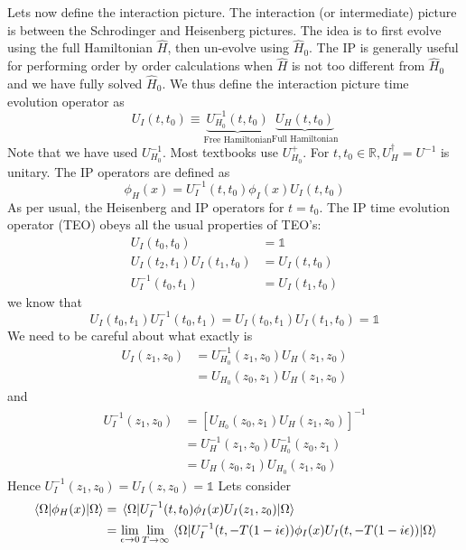 Lets now define the interaction picture. The interaction (or intermediate) picture is between the Schrodinger and Heisenberg pictures. The idea is to  first evolve using the full Hamiltonian $\hat{H}$, then un-evolve using $\hat{H}_0$. The IP is generally useful for performing order by order calculations when $\hat{H}$ is not too different from $\hat{H}_0$ and we have fully solved $\hat{H}_0$.  We thus define the interaction picture time evolution operator as
\begin{equation}
    U_I (t, t_0) \equiv \underbrace{U_{H_0}^{-1} (t, t_0)}_\text{Free Hamiltonian} \underbrace{U_H (t, t_0)}_\text{Full Hamiltonian}
\end{equation}
Note that we have used $U_{H_0}^{-1}$. Most textbooks use $U_{H_0}^{+}$. For $t, t_0 \in \mathbb{R}, U_{H}^{\dagger} = U^{-1}$ is unitary. The IP operators are defined as
\begin{equation}
    \phi_{H}(x)= U_{I}^{-1} (t, t_0) \phi_I (x) U_{I}(t, t_0)
\end{equation}
As per usual, the Heisenberg and IP operators for $t = t_0$. The IP time evolution operator (TEO) obeys all the usual properties of TEO's:
\begin{align}
    U_{I} (t_0, t_0) & = \mathds{1} \nonumber\\
    U_I (t_2, t_1) U_I (t_1, t_0) & = U_I (t, t_0)\nonumber\\
    U_{I}^{-1} (t_0, t_1) & = U_I (t_1, t_0)
\end{align}
we know that
\begin{equation}
    U_{I}(t_0 , t_1) U_{I}^{-1} (t_0, t_1)  = U_{I}(t_0, t_1) U_I (t_1, t_0) = \mathds{1}
\end{equation}
We need to be careful about what exactly is
\begin{align}
    U_I (z_1, z_0) & = U_{H_0}^{-1} (z_1 , z_0) U_{H} (z_1, z_0) \nonumber\\
    & = U_{H_0} (z_0 , z_1) U_{H} (z_1, z_0)
\end{align}
and 
\begin{align}
    U_{I}^{-1} (z_1, z_0) & = [U_{H_0} (z_0 , z_1) U_{H} (z_1, z_0)]^{-1} \nonumber\\
    & = U_{H}^{-1} (z_1 , z_0) U_{H_0}^{-1} (z_0, z_1) \nonumber\\
    & = U_H (z_0 , z_1) U_{H_0} (z_1, z_0)
\end{align}
Hence $U_{I}^{-1} (z_1, z_0)=  U_{I}(z, z_0) =\mathds{1}$
Lets consider
\begin{align}
    \mel{\Omega}{\phi_H (x)}{\Omega} & = \mel{\Omega}{  U_{I}^{-1} (t, t_0)  \phi_I (x)   U_I (z_1, z_0)  }{\Omega} \nonumber\\
    & = \lim_{\epsilon \to 0} \lim_{T \to \infty}  \mel{\Omega}{  U_{I}^{-1} (t, -T (1-i\epsilon)) \phi_I (x) U_I (t, -T(1 - i\epsilon))   }{\Omega}
\end{align}
